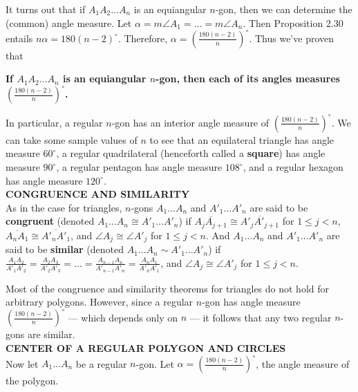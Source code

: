 \documentclass[leqno]{book}
\begin{document}
It turns out that if $A_1A_2\dots A_n$ is an equiangular $n$-gon, then we can determine the (common) angle measure.  Let $\alpha=m\angle A_1=\dots=m\angle A_n$.  Then Proposition 2.30 entails $n\alpha=180(n-2)^\circ$.  Therefore, $\alpha=\left(\frac{180(n-2)}n\right)^\circ$.  Thus we've proven that
\begin{center}
\textbf{If $A_1A_2\dots A_n$ is an equiangular $n$-gon, then each of its angles measures $\left(\frac{180(n-2)}n\right)^\circ$.}
\end{center}
In particular, a regular $n$-gon has an interior angle measure of $\left(\frac{180(n-2)}n\right)^\circ$.  We can take some sample values of $n$ to see that an equilateral triangle has angle measure $60^\circ$, a regular quadrilateral (henceforth called a \textbf{square}) has angle measure $90^\circ$, a regular pentagon has angle measure $108^\circ$, and a regular hexagon has angle measure $120^\circ$.\\

\noindent\textbf{CONGRUENCE AND SIMILARITY}\\

\noindent As in the case for triangles, $n$-gons $A_1\dots A_n$ and $A'_1\dots A'_n$ are said to be \textbf{congruent} (denoted $A_1\dots A_n\cong A'_1\dots A'_n$) if $\overline{A_jA_{j+1}}\cong\overline{A'_jA'_{j+1}}$ for $1\leqslant j<n$, $\overline{A_nA_1}\cong\overline{A'_nA'_1}$, and $\angle A_j\cong\angle A'_j$ for $1\leqslant j<n$.  And $A_1\dots A_n$ and $A'_1\dots A'_n$ are said to be \textbf{similar} (denoted $A_1\dots A_n\sim A'_1\dots A'_n$) if $\frac{A_1A_2}{A'_1A'_2}=\frac{A_2A_3}{A'_2A'_3}=\dots=\frac{A_{n-1}A_n}{A'_{n-1}A'_n}=\frac{A_nA_1}{A'_nA'_1}$, and $\angle A_j\cong\angle A'_j$ for $1\leqslant j<n$.

Most of the congruence and similarity theorems for triangles do not hold for arbitrary polygons.  However, since a regular $n$-gon has angle measure $\left(\frac{180(n-2)}n\right)^\circ$ \---- which depends only on $n$ \---- it follows that any two regular $n$-gons are similar.\\

\noindent\textbf{CENTER OF A REGULAR POLYGON AND CIRCLES}\\

\noindent Now let $A_1\dots A_n$ be a regular $n$-gon.  Let $\alpha=\left(\frac{180(n-2)}n\right)^\circ$, the angle measure of the polygon.
\end{document}
